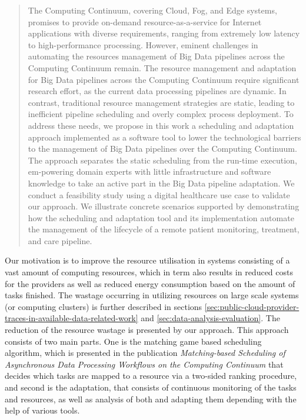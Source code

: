             \begin{quote}
                The Computing Continuum, covering Cloud, Fog, and Edge systems, promises to provide on-demand resource-as-a-service for Internet applications with diverse requirements, ranging from extremely low latency to high-performance processing. However, eminent challenges in automating the resources management of Big Data pipelines across the Computing Continuum remain. The resource management and adaptation for Big Data pipelines across the Computing Continuum require significant research effort, as the current data processing pipelines are dynamic. In contrast, traditional resource management strategies are static, leading to inefficient pipeline scheduling and overly complex process deployment. To address these needs, we propose in this work a scheduling and adaptation approach implemented as a software tool to lower the technological barriers to the management of Big Data pipelines over the Computing Continuum. The approach separates the static scheduling from the run-time execution, em-powering domain experts with little infrastructure and software knowledge to take an active part in the Big Data pipeline adaptation. We conduct a feasibility study using a digital healthcare use case to validate our approach. We illustrate concrete scenarios supported by demonstrating how the scheduling and adaptation tool and its implementation automate the management of the lifecycle of a remote patient monitoring, treatment, and care pipeline. \cite{kimovskiBigDataPipeline2022}
            \end{quote}
            Our motivation is to improve the resource utilisation in systems consisting of a vast amount of computing resources, which in term also results in reduced costs for the providers as well as reduced energy consumption based on the amount of tasks finished.
            The wastage occurring in utilizing resources on large scale systems (or computing clusters) is further described in sections \ref{sec:public-cloud-provider-traces-in-available-data-related-work} and \ref{sec:data-analysis-evaluation}.
            The reduction of the resource wastage is presented by our  approach. 
            This approach consists of two main parts. One is the matching game based scheduling algorithm, which is presented in the publication \emph{Matching-based Scheduling of Asynchronous Data Processing Workflows on the Computing Continuum} \cite{mehranMatchingbasedSchedulingAsynchronous2022} that decides which tasks are mapped to a resource via a two-sided ranking procedure, and second is the adaptation, that consists of continuous monitoring of the tasks and resources, as well as analysis of both and adapting them depending with the help of various tools.


